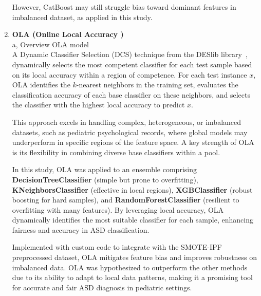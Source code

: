 \documentclass[conference]{IEEEtran}
\begin{document}
\begin{enumerate}
    However, CatBoost may still struggle bias toward dominant features in imbalanced dataset, as applied in this study.

    \item \textbf{OLA (Online Local Accuracy \cite{b16})} \\
    a, Overview OLA model\\

    A Dynamic Classifier Selection (DCS) technique from the DESlib library~\cite{b17}, dynamically selects the most competent classifier for each test sample based on its local accuracy within a region of competence. For each test instance $x$, OLA identifies the $k$-nearest neighbors in the training set, evaluates the classification accuracy of each base classifier on these neighbors, and selects the classifier with the highest local accuracy to predict $x$.

This approach excels in handling complex, heterogeneous, or imbalanced datasets, such as pediatric psychological records, where global models may underperform in specific regions of the feature space. A key strength of OLA is its flexibility in combining diverse base classifiers within a pool. 

In this study, OLA was applied to an ensemble comprising \textbf{DecisionTreeClassifier} (simple but prone to overfitting), \textbf{KNeighborsClassifier} (effective in local regions), \textbf{XGBClassifier} (robust boosting for hard samples), and \textbf{RandomForestClassifier} (resilient to overfitting with many features). By leveraging local accuracy, OLA dynamically identifies the most suitable classifier for each sample, enhancing fairness and accuracy in ASD classification.

Implemented with custom code to integrate with the SMOTE-IPF preprocessed dataset, OLA mitigates feature bias and improves robustness on imbalanced data. OLA was hypothesized to outperform the other methods due to its ability to adapt to local data patterns, making it a promising tool for accurate and fair ASD diagnosis in pediatric settings.\\


\end{enumerate}
\end{document}
